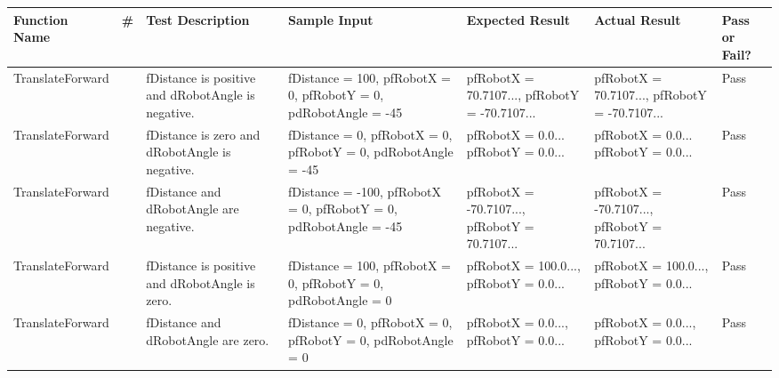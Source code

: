 \documentclass[10pt, letterpaper]{article}
\begin{document}
\begin{table}[h]
    \centering
    \renewcommand{\arraystretch}{1.5}
    \begin{tabularx}{\textwidth}{
            |>{\raggedright\arraybackslash}p{3cm}
            |>{\raggedright\arraybackslash}p{0.20cm}
            |>{\raggedright\arraybackslash}p{2.5cm}
            |>{\raggedright\arraybackslash}X
            |>{\raggedright\arraybackslash}p{3cm}
            |>{\raggedright\arraybackslash}p{3cm}
            |>{\raggedright\arraybackslash}p{1cm}|
        }
        \hline

        \textbf{Function Name} &
        \textbf{\#} &
        \textbf{Test Description} &
        \textbf{Sample Input} &
        \textbf{Expected Result} &
        \textbf{Actual Result} &
        \textbf{Pass or Fail?} \\ 
        \hline


        TranslateForward &
        4 &
        fDistance is positive and dRobotAngle is negative. &
        fDistance = 100, pfRobotX = 0, pfRobotY = 0, pdRobotAngle = -45 &
        pfRobotX = 70.7107..., pfRobotY = -70.7107... &
        pfRobotX = 70.7107..., pfRobotY = -70.7107... &
        Pass \\
        \hline

        TranslateForward &
        5 &
        fDistance is zero and dRobotAngle is negative. &
        fDistance = 0, pfRobotX = 0, pfRobotY = 0, pdRobotAngle = -45 &
        pfRobotX = 0.0... pfRobotY = 0.0... &
        pfRobotX = 0.0... pfRobotY = 0.0... &
        Pass \\
        \hline

        TranslateForward &
        6 &
        fDistance and dRobotAngle are negative. &
        fDistance = -100, pfRobotX = 0, pfRobotY = 0, pdRobotAngle = -45 &
        pfRobotX = -70.7107..., pfRobotY = 70.7107... &
        pfRobotX = -70.7107..., pfRobotY = 70.7107... &
        Pass \\
        \hline

        TranslateForward &
        7 &
        fDistance is positive and dRobotAngle is zero. &
        fDistance = 100, pfRobotX = 0, pfRobotY = 0, pdRobotAngle = 0 &
        pfRobotX = 100.0..., pfRobotY = 0.0... &
        pfRobotX = 100.0..., pfRobotY = 0.0... &
        Pass \\
        \hline

        TranslateForward &
        8 &
        fDistance and dRobotAngle are zero. &
        fDistance = 0, pfRobotX = 0, pfRobotY = 0, pdRobotAngle = 0 &
        pfRobotX = 0.0..., pfRobotY = 0.0... &
        pfRobotX = 0.0..., pfRobotY = 0.0... &
        Pass \\
        \hline


\end{tabularx}
\end{table}
\end{document}
